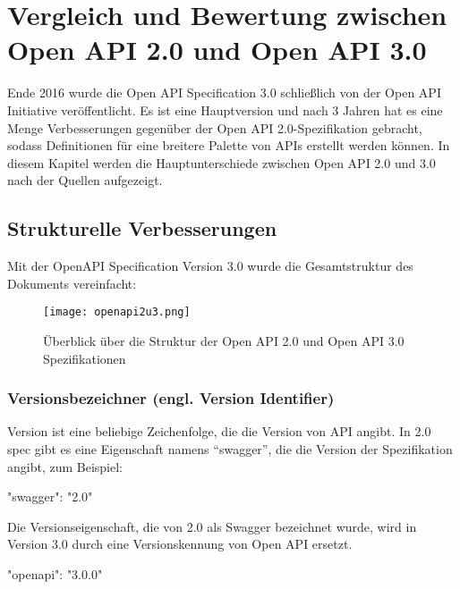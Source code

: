 \chapter{Vergleich und Bewertung zwischen Open API 2.0 und Open API 3.0}
\label{cha:k6}
Ende 2016 wurde die Open API Specification 3.0 schließlich von der Open API Initiative veröffentlicht. Es ist eine Hauptversion und nach 3 Jahren hat es eine Menge Verbesserungen gegenüber der Open API 2.0-Spezifikation gebracht, sodass Definitionen für eine breitere Palette von APIs erstellt werden können. In diesem Kapitel werden die Hauptunterschiede zwischen Open API 2.0 und 3.0 nach der Quellen\cite{swagger20Github, openapi20Github} aufgezeigt.

\section{Strukturelle Verbesserungen}

Mit der OpenAPI Specification Version 3.0 wurde die Gesamtstruktur des Dokuments vereinfacht:

\newpage

\begin{figure}[h]
	\centering
	\texttt{[image: openapi2u3.png]}
	\caption{Überblick über die Struktur der Open API 2.0 und Open API 3.0 Spezifikationen\cite{openapi2u317}}
	\label{openapi2u317-1}
\end{figure}

\subsection{Versionsbezeichner (engl. Version Identifier)}

Version ist eine beliebige Zeichenfolge, die die Version von API angibt\cite{openapiversion17}. In 2.0 spec gibt es eine Eigenschaft namens "`swagger"', die die Version der Spezifikation angibt, zum Beispiel:\\

\begin{LaTeXCode}[caption={Version von Swagger},captionpos=b, label=LaTeXCode:swagger2.0-1][numbers=none]
"swagger": "2.0"\\
\end{LaTeXCode}

Die Versionseigenschaft, die von 2.0 als Swagger bezeichnet wurde, wird in Version 3.0 durch eine Versionskennung von Open API ersetzt.\\

\begin{LaTeXCode}[caption={Version von Open API},captionpos=b, label=LaTeXCode:openapi3.0-1][numbers=none]
"openapi": "3.0.0"\\
\end{LaTeXCode}

